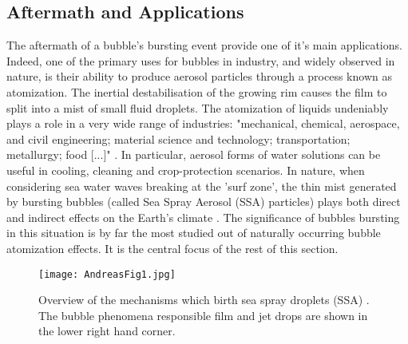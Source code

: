 \documentclass[a4paper,12pt]{article}
\numberwithin{equation}{section}
\numberwithin{figure}{section}
\numberwithin{table}{section}
\begin{document}
\subsection{Aftermath and Applications}

The aftermath of a bubble's bursting event provide one of it's main applications. Indeed, one of the primary uses for bubbles in industry, and widely observed in nature, is their ability to produce aerosol particles through a process known as atomization. The inertial destabilisation of the growing rim causes the film to split into a mist of small fluid droplets. The atomization of liquids undeniably plays a role in a very wide range of industries: "mechanical, chemical, aerospace, and civil engineering; material science and technology; transportation; metallurgy; food [...]" \cite{Bayvel1993}. In particular, aerosol forms of water solutions can be useful in cooling, cleaning and crop-protection scenarios. In nature, when considering sea water waves breaking at the 'surf zone', the thin mist generated by bursting bubbles (called Sea Spray Aerosol (SSA) particles) plays both direct and indirect effects on the Earth's climate \cite{Lhuissier2011, Modini2013, Andreas1995, Wang2017}. The significance of bubbles bursting in this situation is by far the most studied out of naturally occurring bubble atomization effects. It is the central focus of the rest of this section.

\begin{figure}[!htbp]
    \centering
    \captionsetup{width=.9\linewidth}
    \texttt{[image: AndreasFig1.jpg]}
    \caption{Overview of the mechanisms which birth sea spray droplets (SSA) \cite{Andreas1995}. The bubble phenomena responsible film and jet drops are shown in the lower right hand corner.}
    \label{fig:Andreas1}
\end{figure}
\end{document}
